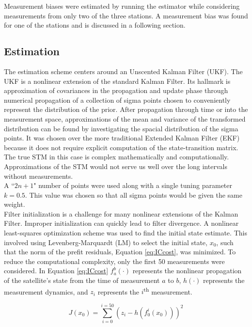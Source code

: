 \documentclass[11pt]{article}
\begin{document}
Measurement biases were estimated by running the estimator while considering measurements from only two of the three stations. A measurement bias was found for one of the stations and is discussed in a following section.

\subsection{Estimation}

The estimation scheme centers around an Unscented Kalman Filter (UKF). The UKF is a nonlinear extension of the standard Kalman Filter. Its hallmark is approximation of covariances in the propagation and update phase through numerical propagation of a collection of sigma points chosen to conveniently represent the distribution of the prior. After propagation through time or into the measurement space, approximations of the mean and variance of the transformed distribution can be found by investigating the spacial distribution of the sigma points. It was chosen over the more traditional Extended Kalman Filter (EKF) because it does not require explicit computation of the state-transition matrix. The true STM in this case is complex mathematically and computationally. Approximations of the STM would not serve us well over the long intervals without measurements. \\

A ``$2n+1$" number of points were used along with a single tuning parameter $k=0.5$. This value was chosen so that all sigma points would be given the same weight. \\

Filter initialization is a challenge for many nonlinear extensions of the Kalman Filter. Improper initialization can quickly lead to filter divergence. A nonlinear least-squares optimization scheme was used to find the initial state estimate. This involved using Levenberg-Marquardt (LM) to select the initial state, $x_0$, such that the norm of the prefit residuals, Equation \eqref{eq:ICcost}, was minimized. To reduce the computational complexity, only the first 50 measurements were considered. In Equation \eqref{eq:ICcost} $f_a^b(\cdot)$ represents the nonlinear propagation of the satellite's state from the time of measurement $a$ to $b$, $h(\cdot)$ represents the measurement dynamics, and $z_i$ represents the $i$\textsuperscript{th} measurement. 

\begin{equation}
	\label{eq:ICcost}
	J(x_0) = \sum_{i=0}^{i=50} \left( z_i - h(f_{0}^{i}(x_0)) \right)^2 
\end{equation}
\end{document}
